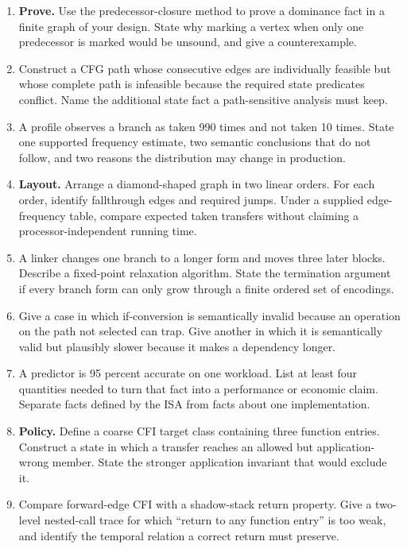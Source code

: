 \begin{enumerate}
\item \textbf{Prove.} Use the predecessor-closure method to prove a dominance
fact in a finite graph of your design. State why marking a vertex when only
one predecessor is marked would be unsound, and give a counterexample.

\item Construct a CFG path whose consecutive edges are individually feasible
but whose complete path is infeasible because the required state predicates
conflict. Name the additional state fact a path-sensitive analysis must keep.

\item A profile observes a branch as taken 990 times and not taken 10 times.
State one supported frequency estimate, two semantic conclusions that do not
follow, and two reasons the distribution may change in production.

\item \textbf{Layout.} Arrange a diamond-shaped graph in two linear orders.
For each order, identify fallthrough edges and required jumps. Under a supplied
edge-frequency table, compare expected taken transfers without claiming a
processor-independent running time.

\item A linker changes one branch to a longer form and moves three later blocks. Describe a
fixed-point relaxation algorithm. State the termination argument if every
branch form can only grow through a finite ordered set of encodings.

\item Give a case in which if-conversion is semantically invalid because an
operation on the path not selected can trap. Give another in which it is
semantically valid but plausibly slower because it makes a dependency longer.

\item A predictor is 95 percent accurate on one workload. List at least four
quantities needed to turn that fact into a performance or economic claim.
Separate facts defined by the ISA from facts about one implementation.

\item \textbf{Policy.} Define a coarse CFI target class containing three
function entries. Construct a state in which a transfer reaches an allowed but
application-wrong member. State the stronger application invariant that would
exclude it.

\item Compare forward-edge CFI with a shadow-stack return property. Give a
two-level nested-call trace for which ``return to any function entry'' is too
weak, and identify the temporal relation a correct return must preserve.


\end{enumerate}
